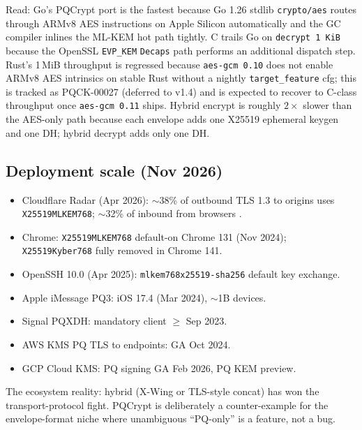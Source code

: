 Read: Go's PQCrypt port is the fastest because Go 1.26 stdlib \texttt{crypto/aes} routes through ARMv8 AES instructions on Apple Silicon automatically and the GC compiler inlines the ML-KEM hot path tightly. C trails Go on \texttt{decrypt 1\,KiB} because the OpenSSL \texttt{EVP\_KEM} \texttt{Decaps} path performs an additional dispatch step. Rust's 1\,MiB throughput is regressed because \texttt{aes-gcm 0.10} does not enable ARMv8 AES intrinsics on stable Rust without a nightly \texttt{target\_feature} cfg; this is tracked as PQCK-00027 (deferred to v1.4) and is expected to recover to C-class throughput once \texttt{aes-gcm 0.11} ships. Hybrid encrypt is roughly $2\times$ slower than the AES-only path because each envelope adds one X25519 ephemeral keygen and one DH; hybrid decrypt adds only one DH.

\subsection{Deployment scale (Nov 2026)}

\begin{itemize}
\item Cloudflare Radar (Apr 2026): $\sim$38\% of outbound TLS 1.3 to origins uses \texttt{X25519MLKEM768}; $\sim$32\% of inbound from browsers \citep{cloudflare-radar}.
\item Chrome: \texttt{X25519MLKEM768} default-on Chrome 131 (Nov 2024); \texttt{X25519Kyber768} fully removed in Chrome 141.
\item OpenSSH 10.0 (Apr 2025): \texttt{mlkem768x25519-sha256} default key exchange.
\item Apple iMessage PQ3: iOS 17.4 (Mar 2024), $\sim$1B devices.
\item Signal PQXDH: mandatory client $\geq$ Sep 2023.
\item AWS KMS PQ TLS to endpoints: GA Oct 2024.
\item GCP Cloud KMS: PQ signing GA Feb 2026, PQ KEM preview.
\end{itemize}

The ecosystem reality: hybrid (X-Wing or TLS-style concat) has won the transport-protocol fight. PQCrypt is deliberately a counter-example for the envelope-format niche where unambiguous ``PQ-only'' is a feature, not a bug.

